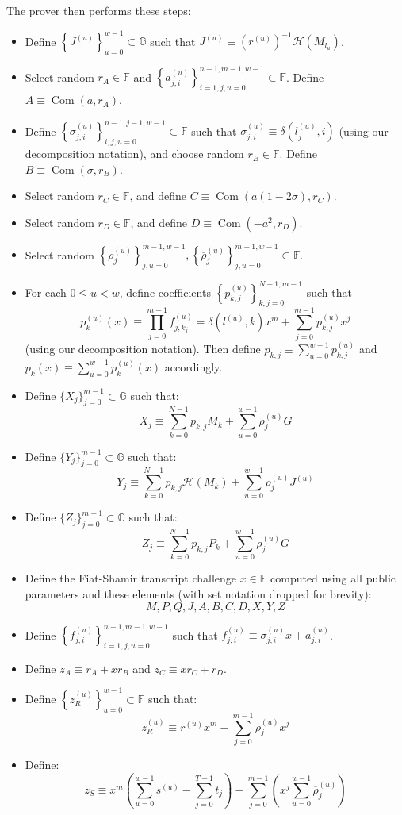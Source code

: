 \documentclass[draft]{article}
\newcommand{\G}{\mathbb{G}}
\newcommand{\F}{\mathbb{F}}
\newcommand{\hp}{\mathcal{H}}
\newcommand{\com}{\operatorname{Com}}
\newcommand{\sumj}{\sum_{j=0}^{m-1}}
\newcommand{\sumk}{\sum_{k=0}^{N-1}}
\newcommand{\sumu}{\sum_{u=0}^{w-1}}
\begin{document}
The prover then performs these steps:
\begin{itemize}
\item Define $\left\{J^{(u)}\right\}_{u=0}^{w-1} \subset \G$ such that $J^{(u)} \equiv (r^{(u)})^{-1}\hp(M_{l_u})$.
\item Select random $r_A \in \F$ and $\left\{a^{(u)}_{j,i}\right\}_{i=1,j,u=0}^{n-1,m-1,w-1} \subset \F$.
Define $A \equiv \com(a,r_A)$.
\item Define $\left\{\sigma^{(u)}_{j,i}\right\}_{i,j,u=0}^{n-1,j-1,w-1} \subset \F$ such that $\sigma^{(u)}_{j,i} \equiv \delta\left(l^{(u)}_j,i\right)$ (using our decomposition notation), and choose random $r_B \in \F$.
Define $B \equiv \com(\sigma,r_B)$.
\item Select random $r_C \in \F$, and define $C \equiv \com(a(1-2\sigma), r_C)$.
\item Select random $r_D \in \F$, and define $D \equiv \com(-a^2, r_D)$.
\item Select random $\left\{\rho^{(u)}_j\right\}_{j,u=0}^{m-1,w-1}, \left\{\overline{\rho}^{(u)}_j\right\}_{j,u=0}^{m-1,w-1} \subset \F$.
\item For each $0 \leq u < w$, define coefficients $\left\{p^{(u)}_{k,j}\right\}_{k,j=0}^{N-1,m-1}$ such that $$p^{(u)}_k(x) \equiv \prod_{j=0}^{m-1} f^{(u)}_{j,k_j} = \delta\left(l^{(u)},k\right)x^m + \sumj p^{(u)}_{k,j}x^j$$ (using our decomposition notation).
Then define $p_{k,j} \equiv \sumu p^{(u)}_{k,j}$ and $p_k(x) \equiv \sumu p^{(u)}_k(x)$ accordingly.
\item Define $\{X_j\}_{j=0}^{m-1} \subset \G$ such that: $$X_j \equiv \sumk p_{k,j}M_k + \sumu \rho^{(u)}_jG$$
\item Define $\{Y_j\}_{j=0}^{m-1} \subset \G$ such that: $$Y_j \equiv \sumk p_{k,j}\hp(M_k) + \sumu \rho^{(u)}_jJ^{(u)}$$
\item Define $\{Z_j\}_{j=0}^{m-1} \subset \G$ such that: $$Z_j \equiv \sumk p_{k,j}P_k + \sumu \overline{\rho}^{(u)}_jG$$
\item Define the Fiat-Shamir transcript challenge $x \in \F$ computed using all public parameters and these elements (with set notation dropped for brevity): $$M,P,Q,J,A,B,C,D,X,Y,Z$$
\item Define $\left\{f^{(u)}_{j,i}\right\}_{i=1,j,u=0}^{n-1,m-1,w-1}$ such that $f^{(u)}_{j,i} \equiv \sigma^{(u)}_{j,i}x + a^{(u)}_{j,i}$.
\item Define $z_A \equiv r_A + xr_B$ and $z_C \equiv xr_C + r_D$.
\item Define $\left\{z^{(u)}_R\right\}_{u=0}^{w-1} \subset \F$ such that: $$z^{(u)}_R \equiv r^{(u)}x^m - \sumj \rho^{(u)}_jx^j$$
\item Define: $$z_S \equiv x^m\left( \sumu s^{(u)} - \sum_{j=0}^{T-1} t_j \right) - \sumj \left(x^j \sumu \overline{\rho}^{(u)}_j\right)$$
\end{itemize}
\end{document}
